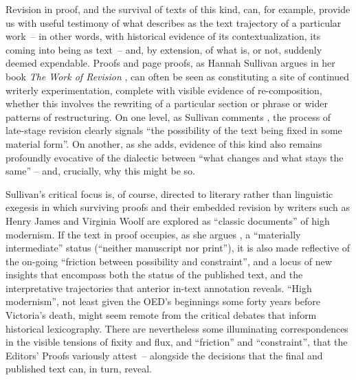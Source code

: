 \documentclass[output=paper,colorlinks,citecolor=brown,arabicfont,chinesefont]{langscibook}
\begin{document}
Revision in proof, and the survival of texts of this kind, can, for example, provide us with useful testimony of what \citet[103]{Lillis2013} describes as the text trajectory of a particular work~-- in other words, with historical evidence of its contextualization, its coming into being as text~-- and, by extension, of what is, or not, suddenly deemed expendable. Proofs and page proofs, as Hannah Sullivan argues in her book \emph{The Work of Revision} \citep{Sullivan2013}, can often be seen as constituting a site of continued writerly experimentation, complete with visible evidence of re-composition, whether this involves the rewriting of a particular section or phrase or wider patterns of restructuring. On one level, as Sullivan comments \citep[4]{Sullivan2013}, the process of late-stage revision clearly signals “the possibility of the text being fixed in some material form”. On another, as she adds, evidence of this kind also remains profoundly evocative of the dialectic between “what changes and what stays the same” – and, crucially, why this might be so.

Sullivan’s critical focus is, of course, directed to literary rather than linguistic exegesis in which surviving proofs and their embedded revision by writers such as Henry James and Virginia Woolf are explored as “classic documents” of high modernism. If the text in proof occupies, as she argues \citep[6]{Sullivan2013}, a “materially intermediate” status (“neither manuscript nor print”), it is also made reflective of the on-going “friction between possibility and constraint”, and a locus of new insights that encompass both the status of the published text, and the interpretative trajectories that anterior in-text annotation reveals. “High modernism”, not least given the OED’s beginnings some forty years before Victoria’s death, might seem remote from the critical debates that inform historical lexicography. There are nevertheless some illuminating correspondences in the visible tensions of fixity and flux, and “friction” and “constraint”, that the Editors’ Proofs variously attest~-- alongside the decisions that the final and published text can, in turn, reveal.
\end{document}
